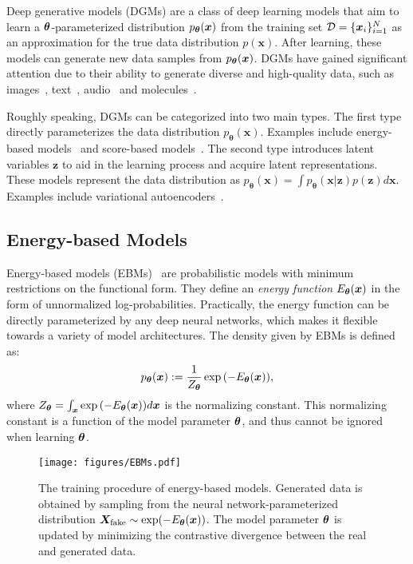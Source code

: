Deep generative models (DGMs) are a class of deep learning models that aim to learn a $\bm{\theta}$-parameterized distribution $p_{\bm{\theta}}(\bm{x})$ from the training set $\mathcal{D}=\{\bm{x}_i\}_{i=1}^N$ as an approximation for the true data distribution $p(\bm{x})$. After learning, these models can generate new data samples from $p_{\bm{\theta}}(\bm{x})$. DGMs have gained significant attention due to their ability to generate diverse and high-quality data, such as images~\citep{lugmayr2022repaint,saharia2022palette,kawar2023imagic}, text~\citep{gu2022vector,gong2022diffuseq,yang2023diffsound}, audio~\citep{chung2015recurrent,kong2020diffwave,huang2022fastdiff} and molecules~\citep{li2014generalized,collins2015energy,xu2021geodiff}.

Roughly speaking, DGMs can be categorized into two main types. The first type directly parameterizes the data distribution $p_{\bm{\theta}}(\bm{x})$. Examples include energy-based models~\citep{lecun2006tutorial} and score-based models~\citep{song2020score}. The second type introduces latent variables $\bm{z}$ to aid in the learning process and acquire latent representations. These models represent the data distribution as $p_{\bm{\theta}}(\bm{x})=\int p_{\bm{\theta}}(\bm{x}|\bm{z})p(\bm{z})d\bm{x}$. Examples include variational autoencoders~\citep{kingma2014auto}. 


\subsection{Energy-based Models}
\label{sec:dgm_ebm}
Energy-based models (EBMs)~\citep{lecun2006tutorial} are probabilistic models with minimum restrictions on the functional form. They define an \emph{energy function} $E_{\bm{\theta}}(\bm{x})$ in the form of unnormalized log-probabilities. Practically, the energy function can be directly parameterized by any deep neural networks, which makes it flexible towards a variety of model architectures. The density given by EBMs is defined as:
\begin{equation}
    p_{\bm{\theta}}(\bm{x}):=\frac{1}{Z_{\bm{\theta}}}\exp{\left(-E_{\bm{\theta}}(\bm{x})\right)},
\end{equation}
where $Z_{\bm{\theta}}=\int_{\bm{x}}\exp{\left(-E_{\bm{\theta}}(\bm{x})\right)}d\bm{x}$ is the normalizing constant. This normalizing constant is a function of the model parameter $\bm{\theta}$, and thus cannot be ignored when learning $\bm{\theta}$.

\begin{figure}[t]
    \centering
    \texttt{[image: figures/EBMs.pdf]}
    \caption{The training procedure of energy-based models. Generated data is obtained by sampling from the neural network-parameterized distribution $\bm{X}_{\text{fake}}\sim\exp(-E_{\bm{\theta}}(\bm{x}))$. The model parameter $\bm{\theta}$ is updated by minimizing the contrastive divergence between the real and generated data.}
    \label{fig:ebms}
\end{figure}

